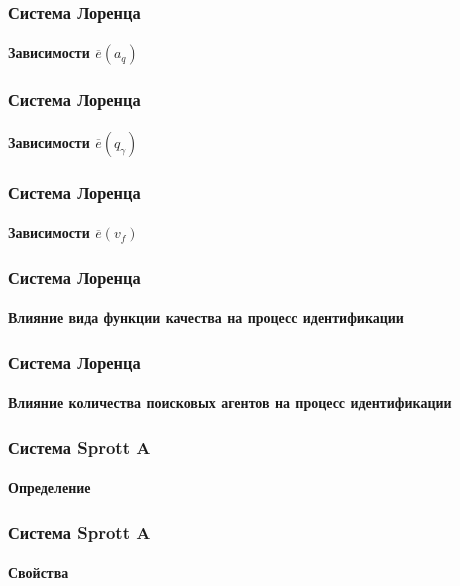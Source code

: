 \documentclass[10pt,utf8]{beamer}
\begin{document}

\begin{frame}
  \frametitle{Система Лоренца}
  \framesubtitle{Зависимости $\overline{e}(a_q)$}


\end{frame}




\begin{frame}
  \frametitle{Система Лоренца}
  \framesubtitle{Зависимости $\overline{e}(q_\gamma)$}


\end{frame}


\begin{frame}
  \frametitle{Система Лоренца}
  \framesubtitle{Зависимости $\overline{e}(v_f)$}


\end{frame}



\begin{frame}
  \frametitle{Система Лоренца}
  \framesubtitle{Влияние вида функции качества на процесс идентификации}


\end{frame}



\begin{frame}
  \frametitle{Система Лоренца}
  \framesubtitle{Влияние количества поисковых агентов на процесс идентификации}


\end{frame}




\begin{frame}
  \frametitle{Система Sprott A}
  \framesubtitle{Определение}


\end{frame}


\begin{frame}
  \frametitle{Система Sprott A}
  \framesubtitle{Свойства}


\end{frame}
\end{document}

